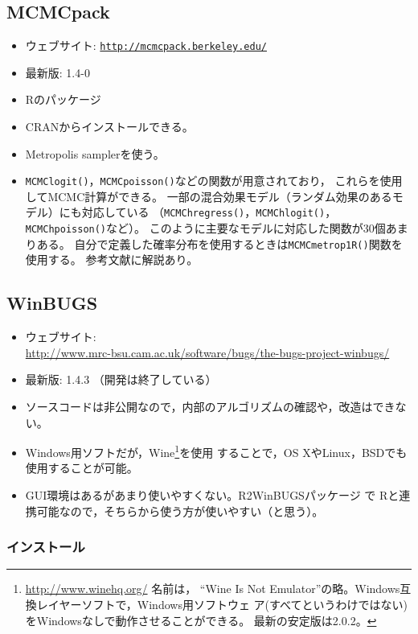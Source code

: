 \documentclass[11pt,uplatex]{jsarticle}
\begin{document}
\subsection{MCMCpack}

\begin{itemize}
\item ウェブサイト: \texttt{\url{http://mcmcpack.berkeley.edu/}}
\item 最新版: 1.4-0
\item \textsf{R}のパッケージ
\item CRANからインストールできる。
\item Metropolis samplerを使う。
\item \texttt{MCMClogit()}，\texttt{MCMCpoisson()}などの関数が用意されており，
これらを使用してMCMC計算ができる。
一部の混合効果モデル（ランダム効果のあるモデル）にも対応している
（\texttt{MCMChregress()}，\texttt{MCMChlogit()}，
\texttt{MCMChpoisson()}など）。
このように主要なモデルに対応した関数が30個あまりある。
自分で定義した確率分布を使用するときは\texttt{MCMCmetrop1R()}関数を使用する。
参考文献\cite{MCMCpack}に解説あり。
\end{itemize}

\subsection{WinBUGS}

\begin{itemize}
\item ウェブサイト:\\
  \url{http://www.mrc-bsu.cam.ac.uk/software/bugs/the-bugs-project-winbugs/}
\item 最新版: 1.4.3 （開発は終了している）
\item ソースコードは非公開なので，内部のアルゴリズムの確認や，改造はできない。
\item Windows用ソフトだが，\textsf{Wine}\footnote{\url{http://www.winehq.org/} 名前は，
``Wine Is Not Emulator''の略。Windows互換レイヤーソフトで，Windows用ソフトウェ
  ア(すべてというわけではない)をWindowsなしで動作させることができる。
  最新の安定版は2.0.2。}を使用
  することで，OS XやLinux，BSDでも使用することが可能。
\item GUI環境はあるがあまり使いやすくない。\textsf{R2WinBUGS}パッケージ
  で \textsf{R}と連携可能なので，そちらから使う方が使いやすい（と思う）。
\end{itemize}

\subsubsection*{インストール}
\end{document}
